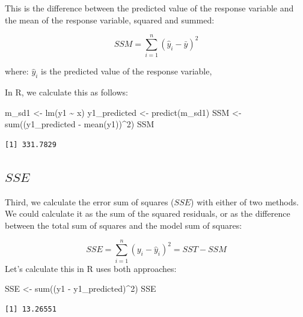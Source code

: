 \documentclass[
  letterpaper,
  8pt,
  a4paper]{book}
\newenvironment{Shaded}{\begin{snugshade}}{\end{snugshade}}
\newcommand{\DecValTok}[1]{\textcolor[rgb]{0.68,0.00,0.00}{#1}}
\newcommand{\FunctionTok}[1]{\textcolor[rgb]{0.28,0.35,0.67}{#1}}
\newcommand{\NormalTok}[1]{\textcolor[rgb]{0.00,0.23,0.31}{#1}}
\newcommand{\OtherTok}[1]{\textcolor[rgb]{0.00,0.23,0.31}{#1}}
\newcommand{\SpecialCharTok}[1]{\textcolor[rgb]{0.37,0.37,0.37}{#1}}
\begin{document}
This is the difference between the predicted value of the response
variable and the mean of the response variable, squared and summed:

\[SSM = \sum_{i=1}^{n} (\hat{y}_i - \bar{y})^2\]

where: \(\hat{y}_i\) is the predicted value of the response variable,

In R, we calculate this as follows:

\begin{Shaded}
\begin{Highlighting}[]
\NormalTok{m\_sd1 }\OtherTok{\textless{}{-}} \FunctionTok{lm}\NormalTok{(y1 }\SpecialCharTok{\textasciitilde{}}\NormalTok{ x)}
\NormalTok{y1\_predicted }\OtherTok{\textless{}{-}} \FunctionTok{predict}\NormalTok{(m\_sd1)}
\NormalTok{SSM }\OtherTok{\textless{}{-}} \FunctionTok{sum}\NormalTok{((y1\_predicted }\SpecialCharTok{{-}} \FunctionTok{mean}\NormalTok{(y1))}\SpecialCharTok{\^{}}\DecValTok{2}\NormalTok{)}
\NormalTok{SSM}
\end{Highlighting}
\end{Shaded}

\begin{verbatim}
[1] 331.7829
\end{verbatim}

\subsection*{\texorpdfstring{\(SSE\)}{SSE}}\label{sse}

Third, we calculate the error sum of squares (\(SSE\)) with either of
two methods. We could calculate it as the sum of the squared residuals,
or as the difference between the total sum of squares and the model sum
of squares:

\[SSE = \sum_{i=1}^{n} (y_i - \hat{y}_i)^2 = SST - SSM\] Let's calculate
this in R uses both approaches:

\begin{Shaded}
\begin{Highlighting}[]
\NormalTok{SSE }\OtherTok{\textless{}{-}} \FunctionTok{sum}\NormalTok{((y1 }\SpecialCharTok{{-}}\NormalTok{ y1\_predicted)}\SpecialCharTok{\^{}}\DecValTok{2}\NormalTok{)}
\NormalTok{SSE}
\end{Highlighting}
\end{Shaded}

\begin{verbatim}
[1] 13.26551
\end{verbatim}
\end{document}
